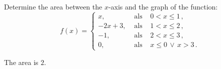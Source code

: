 \renewcommand{\ExerciseListName}{Assignements}

\subsection*{}
\ifanalysis\begin{Exercise}[difficulty = 1]\fi\ifcalculus\begin{Exercise}[difficulty = 2]\fi
Determine the area between the $x$-axis and the graph of the function:
\[
f(x) = \left\{\begin{array}{lcl}
x,  & \text{ als  } & 0<x\leq1\,,\\[0.1cm]
-2x+3,  & \text{ als  } & 1<x\leq2\,,\\[0.1cm]
-1,   & \text{ als  } &  2<x\leq3\,,\\[0.1cm]
0,   & \text{ als  } &  x \leq 0 \,  \vee \, x > 3\,.
\end{array}\right.
\]

\ifanalysis\end{Exercise}\fi\ifcalculus\end{Exercise}\fi
{}
\begin{Answer}\phantom{}
    The area is $2$.
\end{Answer}


\ifanalysis
\subsection*{}

